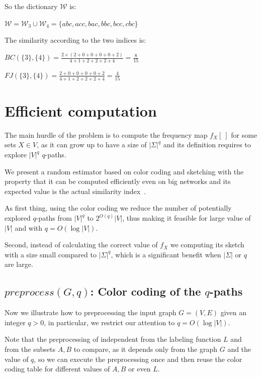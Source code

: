 So the dictionary $\mathcal{W}$ is: \medskip
		
$\mathcal{W} = \mathcal{W}_3 \cup \mathcal{W}_4 = \{ abc, acc, bac, bbc, bcc, cbc \}$\bigskip
		
The similarity according to the two indices is: \medskip

$BC(\{3\}, \{4\}) = \frac{2 \times ( 2 + 0 + 0 + 0 + 0 + 2 ) }{ 4 + 1 + 2 + 2 + 2 + 4 } = \frac{8}{15}$ \medskip
		
$FJ(\{3\}, \{4\}) = \frac{ 2 + 0 + 0 + 0 + 0 + 2 }{ 4 + 1 + 2 + 2 + 2 + 4 } = \frac{4}{15}$ \medskip
		
\clearpage

\section{Efficient computation}

The main hurdle of the problem is to compute the frequency map $f_{X}[\ ]$ for some sets $X \in V$, as it can grow up to have a size of $|\Sigma|^{q}$ and its definition requires to explore $|V|^{q}$ $q$-paths.\medskip

We present a random estimator based on color coding and sketching with the property that it can be computed efficiently even on big networks and its expected value is the actual similarity index~\cite{SubSim}.\medskip

As first thing, using the color coding we reduce the number of potentially explored $q$-paths from $|V|^{q}$ to $2^{O(q)}|V|$, thus making it feasible for large value of $|V|$ and with $q = O(\log |V|)$.

Second, instead of calculating the correct value of $f_{X}$ we computing its sketch with a size small compared to $|\Sigma|^{q}$, which is a significant benefit when $|\Sigma|$ or $q$ are large.

\subsection*{$preprocess(G,q)$: Color coding of the $q$-paths}

Now we illustrate how to preprocessing the input graph $G=(V,E)$ given an integer $q > 0$, in particular, we restrict our attention to $q = O(\log |V|)$.

Note that the preprocessing of independent from the labeling function $L$ and from the subsets $A,B$ to compare, as it depends only from the graph $G$ and the value of $q$, so we can execute the preprocessing once and then reuse the color coding table for different values of $A,B$ or even $L$.\medskip


